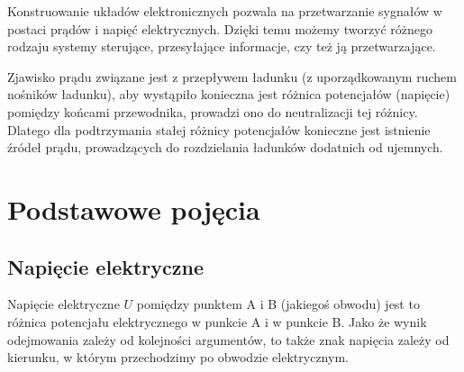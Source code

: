 % 
% 
% 
% 

Konstruowanie układów elektronicznych pozwala na przetwarzanie sygnałów w postaci prądów i napięć elektrycznych. Dzięki temu możemy tworzyć różnego rodzaju systemy sterujące, przesyłające informacje, czy też ją przetwarzające.

Zjawisko prądu związane jest z przepływem ładunku (z uporządkowanym ruchem nośników ładunku), aby wystąpiło konieczna jest różnica potencjałów (napięcie) pomiędzy końcami przewodnika, prowadzi ono do neutralizacji tej różnicy.
Dlatego dla podtrzymania stałej różnicy potencjałów konieczne jest istnienie źródeł prądu, prowadzących do rozdzielania ładunków dodatnich od ujemnych.

\section{Podstawowe pojęcia}

\subsection{Napięcie elektryczne}

Napięcie elektryczne $U$ pomiędzy punktem A i B (jakiegoś obwodu)
jest to różnica potencjału elektrycznego w punkcie A i w punkcie B.
Jako że wynik odejmowania zależy od kolejności argumentów, to także znak napięcia zależy od kierunku, w którym przechodzimy po obwodzie elektrycznym.

